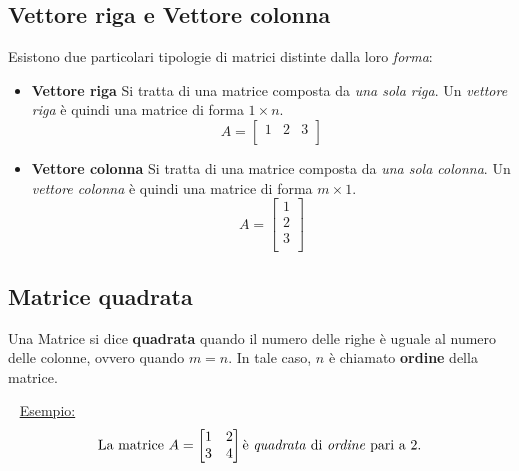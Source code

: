 \documentclass[11pt,oneside]{book}
\begin{document}
\subsection{Vettore riga e Vettore colonna}
Esistono due particolari tipologie di matrici distinte dalla loro \emph{forma}:
\begin{itemize}
    \item \textbf{Vettore riga} \newline
          Si tratta di una matrice composta da \emph{una sola riga}. Un \emph{vettore riga} è quindi una matrice
          di forma $1 \times n$.
          \begin{equation*}
              A =
              \begin{bmatrix}
                  1 & 2 & 3 \\
              \end{bmatrix}
          \end{equation*}
    \item \textbf{Vettore colonna} \newline
          Si tratta di una matrice composta da \emph{una sola colonna}. Un \emph{vettore colonna} è quindi una matrice
          di forma $m \times 1$.
          \begin{equation*}
              A =
              \begin{bmatrix}
                  1 \\ 2 \\ 3 \\
              \end{bmatrix}
          \end{equation*}
\end{itemize}

\newpage
\subsection{Matrice quadrata}
Una Matrice si dice \textbf{quadrata} quando il numero delle righe è uguale al numero delle colonne, ovvero quando
$m = n$. In tale caso, $n$ è chiamato \textbf{ordine} della matrice.

~\newline
\underline{Esempio:}
\begin{equation*}
    \text{La matrice }A =
    \begin{bmatrix}
        1 & 2 \\
        3 & 4 \\
    \end{bmatrix}
    \text{è \emph{quadrata} di \emph{ordine} pari a 2.}
\end{equation*}
\end{document}
